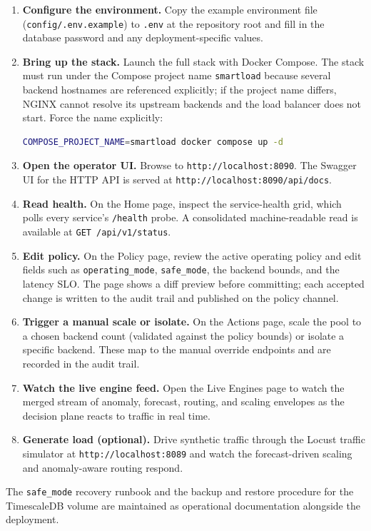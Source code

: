 \begin{enumerate}
  \item \textbf{Configure the environment.} Copy the example environment file
        (\texttt{config/.env.example}) to \texttt{.env} at the repository root
        and fill in the database password and any deployment-specific values.

  \item \textbf{Bring up the stack.} Launch the full stack with Docker Compose.
        The stack must run under the Compose project name \texttt{smartload}
        because several backend hostnames are referenced explicitly; if the
        project name differs, NGINX cannot resolve its upstream backends and the
        load balancer does not start. Force the name explicitly:
\begin{lstlisting}[language=bash]
COMPOSE_PROJECT_NAME=smartload docker compose up -d
\end{lstlisting}

  \item \textbf{Open the operator UI.} Browse to \texttt{http://localhost:8090}.
        The Swagger UI for the HTTP API is served at
        \texttt{http://localhost:8090/api/docs}.

  \item \textbf{Read health.} On the Home page, inspect the service-health grid,
        which polls every service's \texttt{/health} probe. A consolidated
        machine-readable read is available at \texttt{GET /api/v1/status}.

  \item \textbf{Edit policy.} On the Policy page, review the active operating
        policy and edit fields such as \texttt{operating\_mode},
        \texttt{safe\_mode}, the backend bounds, and the latency SLO. The page
        shows a diff preview before committing; each accepted change is written
        to the audit trail and published on the policy channel.

  \item \textbf{Trigger a manual scale or isolate.} On the Actions page, scale
        the pool to a chosen backend count (validated against the policy bounds)
        or isolate a specific backend. These map to the manual override
        endpoints and are recorded in the audit trail.

  \item \textbf{Watch the live engine feed.} Open the Live Engines page to watch
        the merged stream of anomaly, forecast, routing, and scaling envelopes
        as the decision plane reacts to traffic in real time.

  \item \textbf{Generate load (optional).} Drive synthetic traffic through the
        Locust traffic simulator at \texttt{http://localhost:8089} and watch
        the forecast-driven scaling and anomaly-aware routing respond.
\end{enumerate}

The \texttt{safe\_mode} recovery runbook and the backup and restore procedure for
the TimescaleDB volume are maintained as operational documentation alongside the
deployment.

